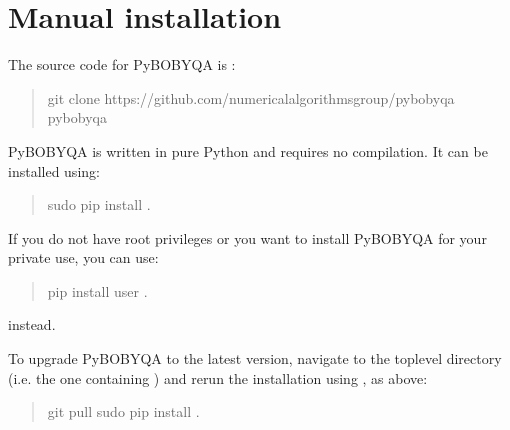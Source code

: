 \documentclass[letterpaper,10pt,english]{sphinxmanual}
\begin{document}
\section{Manual installation}
\label{\detokenize{install:manual-installation}}
The source code for Py\sphinxhyphen{}BOBYQA is :
\begin{quote}

\begin{sphinxVerbatim}[commandchars=\\\{\}]
\PYGZdl{} git clone https://github.com/numericalalgorithmsgroup/pybobyqa
\PYGZdl{}  pybobyqa
\end{sphinxVerbatim}
\end{quote}

Py\sphinxhyphen{}BOBYQA is written in pure Python and requires no compilation. It can be installed using:
\begin{quote}

\begin{sphinxVerbatim}[commandchars=\\\{\}]
\PYGZdl{} \PYG{o}{[}sudo\PYG{o}{]} pip install .
\end{sphinxVerbatim}
\end{quote}

If you do not have root privileges or you want to install Py\sphinxhyphen{}BOBYQA for your private use, you can use:
\begin{quote}

\begin{sphinxVerbatim}[commandchars=\\\{\}]
\PYGZdl{} pip install \PYGZhy{}\PYGZhy{}user .
\end{sphinxVerbatim}
\end{quote}

instead.

To upgrade Py\sphinxhyphen{}BOBYQA to the latest version, navigate to the top\sphinxhyphen{}level directory (i.e. the one containing ) and rerun the installation using , as above:
\begin{quote}

\begin{sphinxVerbatim}[commandchars=\\\{\}]
\PYGZdl{} git pull
\PYGZdl{} \PYG{o}{[}sudo\PYG{o}{]} pip install .  
\end{sphinxVerbatim}
\end{quote}
\end{document}

